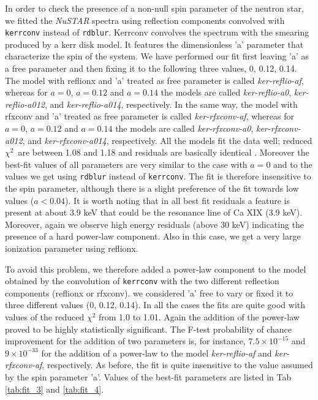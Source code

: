 \documentclass{aa}
\begin{document}
\begin{appendix}
In order to check the presence of a non-null spin parameter of the neutron 
star, we fitted the \emph{NuSTAR} spectra using reflection components 
convolved with \texttt{kerrconv} instead 
of \texttt{rdblur}. Kerrconv convolves the spectrum with the smearing 
produced by a kerr disk model. It features the dimensionless 'a' parameter 
that characterize the spin of the system. 
We have performed our fit first leaving 'a' as a free parameter and then
fixing it to the following three values, 0, 0.12, 0.14. The model with reflionx and 
'a' treated as free parameter is called \emph{ker-reflio-af}, whereas for 
$a=0$, $a=0.12$ and $a=0.14$ the models are called \emph{ker-reflio-a0}, 
\emph{ker-reflio-a012}, and \emph{ker-reflio-a014}, respectively. 
In the same way, the model with rfxconv and 'a' treated as free parameter 
is called \emph{ker-rfxconv-af}, whereas for $a=0$, $a=0.12$ and $a=0.14$ 
the models are called \emph{ker-rfxconv-a0}, \emph{ker-rfxconv-a012}, and 
\emph{ker-rfxconv-a014}, respectively. All the models fit the data well;
reduced $\chi^{2}\,$ are between 1.08 and 1.18 and residuals are basically 
identical . Moreover the best-fit 
values of all parameters are very similar to the case with $a=0$ and to the 
values we get using \texttt{rdblur} instead of \texttt{kerrconv}. The fit is 
therefore insensitive to the spin parameter, although there is 
a slight preference of the fit towards low values ($a<0.04$).
It is worth noting that in all best fit residuals a feature is present 
at about 3.9 keV that could be the resonance line of Ca XIX (3.9 keV). 
Moreover, again we observe high energy residuals (above 30 keV) indicating
the presence of a hard power-law component. Also in this case, we get a 
very large ionization parameter using reflionx. 

To avoid this problem, we therefore added a power-law component to the model 
obtained by the convolution of \texttt{kerrconv} with the two different reflection 
components (reflionx or rfxconv). we considered 'a' free to vary or fixed it to
three different values (0, 0.12, 0.14). In all the cases the fits are quite
good with values of the reduced $\chi^2$ from 1.0 to 1.01. Again the addition 
of the power-law proved to be highly statistically significant. The F-test 
probability of chance improvement for the addition of two parameters is,
for instance, $7.5 \times 10^{-15}$ and $9 \times 10^{-33}$ for the addition 
of a power-law to the model \emph{ker-reflio-af} and \emph{ker-rfxconv-af},
respectively.
As before, the fit is quite insensitive to the value assumed by the spin 
parameter 'a'. 
Values of the best-fit parameters are listed in Tab \ref{tab:fit_3} and \ref{tab:fit_4}.


\end{appendix}
\end{document}
